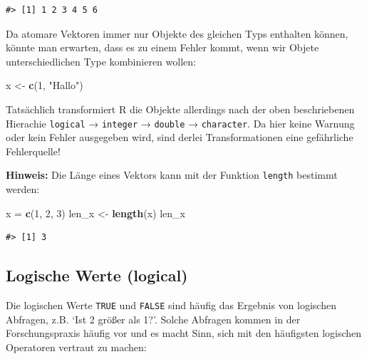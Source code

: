 \documentclass[]{book}
\newenvironment{Shaded}{\begin{snugshade}}{\end{snugshade}}
\newcommand{\KeywordTok}[1]{\textcolor[rgb]{0.13,0.29,0.53}{\textbf{#1}}}
\newcommand{\DecValTok}[1]{\textcolor[rgb]{0.00,0.00,0.81}{#1}}
\newcommand{\StringTok}[1]{\textcolor[rgb]{0.31,0.60,0.02}{#1}}
\newcommand{\NormalTok}[1]{#1}
\begin{document}
\begin{verbatim}
#> [1] 1 2 3 4 5 6
\end{verbatim}

Da atomare Vektoren immer nur Objekte des gleichen Typs enthalten
können, könnte man erwarten, dass es zu einem Fehler kommt, wenn wir
Objete unterschiedlichen Type kombinieren wollen:

\begin{Shaded}
\begin{Highlighting}[]
\NormalTok{x <-}\StringTok{ }\KeywordTok{c}\NormalTok{(}\DecValTok{1}\NormalTok{, }\StringTok{"Hallo"}\NormalTok{)}
\end{Highlighting}
\end{Shaded}

Tatsächlich transformiert R die Objekte allerdings nach der oben
beschriebenen Hierachie \texttt{logical} → \texttt{integer} →
\texttt{double} → \texttt{character}. Da hier keine Warnung oder kein
Fehler ausgegeben wird, sind derlei Transformationen eine gefährliche
Fehlerquelle!

\textbf{Hinweis:} Die Länge eines Vektors kann mit der Funktion
\texttt{length} bestimmt werden:

\begin{Shaded}
\begin{Highlighting}[]
\NormalTok{x =}\StringTok{  }\KeywordTok{c}\NormalTok{(}\DecValTok{1}\NormalTok{, }\DecValTok{2}\NormalTok{, }\DecValTok{3}\NormalTok{)}
\NormalTok{len_x <-}\StringTok{ }\KeywordTok{length}\NormalTok{(x)}
\NormalTok{len_x}
\end{Highlighting}
\end{Shaded}

\begin{verbatim}
#> [1] 3
\end{verbatim}

\subsection{Logische Werte (logical)}\label{logische-werte-logical}

Die logischen Werte \texttt{TRUE} und \texttt{FALSE} sind häufig das
Ergebnis von logischen Abfragen, z.B. `Ist 2 größer als 1?'. Solche
Abfragen kommen in der Forschungspraxis häufig vor und es macht Sinn,
sich mit den häufigsten logischen Operatoren vertraut zu machen:
\end{document}
